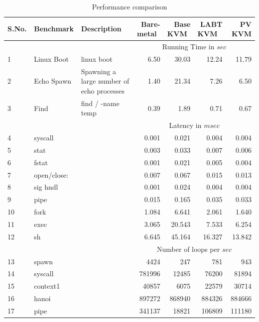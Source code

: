 \documentclass[10pt,twocolumn]{article}
\begin{document}
\begin{table}
\centering
\caption{Performance comparison}
      \begin{tabular}{|l| l|p{5cm} | r r r r|} \hline
	        S.No.\verb, ,&  Benchmark\verb, ,& Description  & Bare-metal \verb, ,& Base KVM \verb, , & LABT KVM \verb, ,& PV KVM \\ \hline

     &&& \multicolumn{4}{c|}{ Running Time in $sec$}\\\cline {4-7}  
      1&  Linux Boot& linux boot & 6.50	& 30.03	& 12.24	& 11.79 \\ \hline
      2& Echo Spawn	& Spawning a large number of echo processes&1.40	& 21.34 &	7.26 &	6.50 \\\hline
      3& Find	& find / -name temp & 0.39	& 1.89	& 0.71	& 0.67 \\ \cline{4-7}
	   &&& \multicolumn{4}{c|}{Latency in $msec$}\\  \cline{4-7}

  4& syscall	& &	0.001	&	0.021	&	0.004	&	0.004	\\\hline
5&stat	&&	0.003	&	0.033	&	0.007	&	0.006	\\\hline
6&fstat	&&	0.001	&	0.021	&	0.005	&	0.004	\\\hline
7&open/close:	&&	0.007	&	0.067	&	0.015	&	0.013	\\\hline
8&sig hndl	&&	0.001	&	0.024	&	0.004	&	0.004	\\\hline
9&pipe 	&&	0.015	&	0.165	&	0.035	&	0.033	\\\hline
10&fork	&&	1.084	&	6.641	&	2.061	&	1.640	\\\hline
11&exec	&&	3.065	&	20.543	&	7.533	&	6.254	\\\hline
12&sh	&&	6.645	&	45.164	&	16.327	&	13.842	\\\hline
&&& \multicolumn{4}{c|}{Number of loops per $sec$}\\  \cline{4-7}

13	&	spawn	& &	4424	&	247	&	781	&	943	\\	\hline
14	&	syscall	& &	781996	&	12485	&	76200	&	81894	\\	\hline
15	&	context1	& &	40857	&	6075	&	22579	&	30714	\\	\hline
16	&	hanoi	& &	897272	&	868940	&	884326	&	884666	\\	\hline
17	&	pipe	& &	341137	&	18821	&	106809	&	111180	\\	\hline

        \hline
      \end{tabular}
\label{tab:lpGMKLsmall}
\end{table} 
\end{document}
